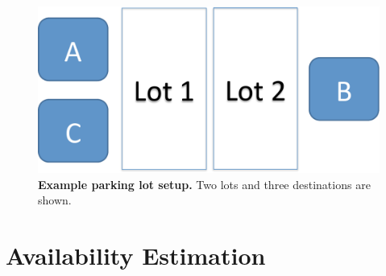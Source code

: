 \begin{figure}
\centering
\includegraphics[width=\columnwidth]{./figures/CartoonLot.pdf}

\caption{\textbf{Example parking lot setup.} Two lots and three
destinations are shown.}

\label{fig-lots}
\end{figure}

\section{Availability Estimation}
\label{sec-model}

